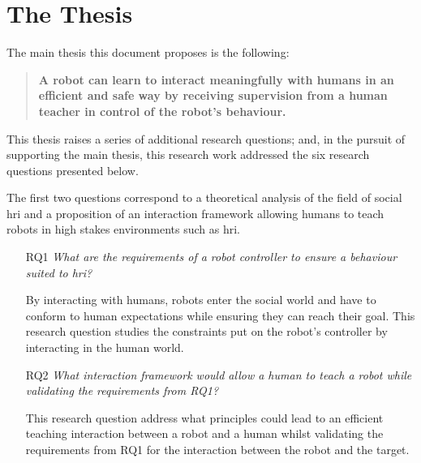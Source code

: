 

\section{The Thesis}\label{sec:intro_thesis}
The main thesis this document proposes is the following:
\begin{quote}
	\textbf{A robot can learn to interact meaningfully with humans in an efficient and safe way by receiving supervision from a human teacher in control of the robot's behaviour.}
\end{quote}

This thesis raises a series of additional research questions; and, in the pursuit of supporting the main thesis, this research work addressed the six research questions presented below.

The first two questions correspond to a theoretical analysis of the field of social \gls{hri} and a proposition of an interaction framework allowing humans to teach robots in high stakes environments such as \gls{hri}.

\begin{itemize}
	\item [RQ1] \emph{What are the requirements of a robot controller to ensure a behaviour suited to \gls{hri}?} 
	
		By interacting with humans, robots enter the social world and have to conform to human expectations while ensuring they can reach their goal. This research question studies the constraints put on the robot's controller by interacting in the human world. 
		
    \item [RQ2] \emph{What interaction framework would allow a human to teach a robot while validating the requirements from RQ1?}
    
    	This research question address what principles could lead to an efficient teaching interaction between a robot and a human whilst validating the requirements from RQ1 for the interaction between the robot and the target. 
\end{itemize}    	


